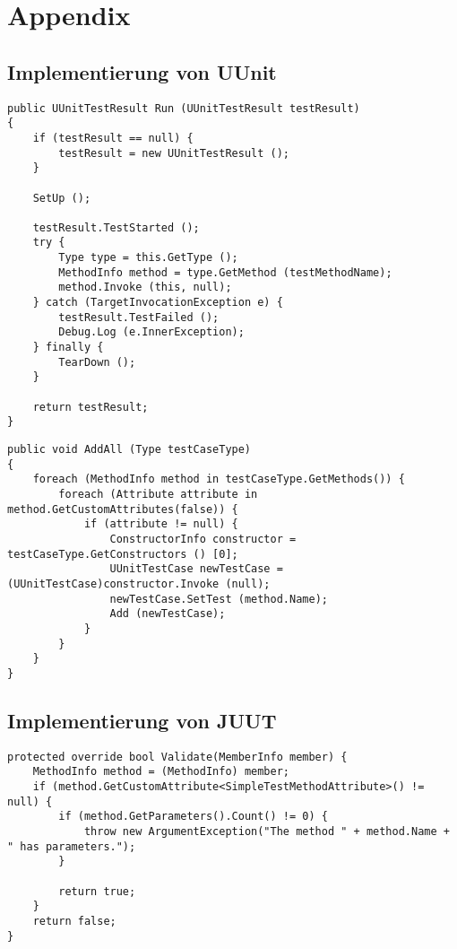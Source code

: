 \chapter{Appendix}

\section{Implementierung von UUnit}

\begin{lstlisting}[caption={[Quellcode der \textit{Run}-Methode von \textit{UUnitTestCase}]Quellcode der \textit{Run}-Methode von \textit{UUnitTestCase}}, label=code:UUnitTestCase_Run]
public UUnitTestResult Run (UUnitTestResult testResult)
{
	if (testResult == null) {
		testResult = new UUnitTestResult ();
	}
	
	SetUp ();
	
	testResult.TestStarted ();
	try {
		Type type = this.GetType ();
		MethodInfo method = type.GetMethod (testMethodName);
		method.Invoke (this, null);
	} catch (TargetInvocationException e) {
		testResult.TestFailed ();
		Debug.Log (e.InnerException);
	} finally {
		TearDown ();
	}
	
	return testResult;
}
\end{lstlisting}
\clearpage

\begin{lstlisting}[caption={[Quellcode der \textit{AddAll}-Methode von \textit{UUnitTestSuite}]Quellcode der \textit{AddAll}-Methode von \textit{UUnitTestSuite}}, label=code:UUnitTestSuite_AddAll]
public void AddAll (Type testCaseType)
{
	foreach (MethodInfo method in testCaseType.GetMethods()) {
		foreach (Attribute attribute in method.GetCustomAttributes(false)) {
			if (attribute != null) {
				ConstructorInfo constructor = testCaseType.GetConstructors () [0];
				UUnitTestCase newTestCase = (UUnitTestCase)constructor.Invoke (null);
				newTestCase.SetTest (method.Name);
				Add (newTestCase);
			}
		}
	}
}
\end{lstlisting}

\section{Implementierung von JUUT}
\begin{lstlisting}[caption={[Quellcode der \textit{Validate}-Methode von \textit{SimpleTestMethodAttribute}]Quellcode der \textit{Validate}-Methode von \textit{SimpleTestMethodAttribute}}, label=code:SimpleTestMethodAttribute_Validate]
protected override bool Validate(MemberInfo member) {
    MethodInfo method = (MethodInfo) member;
    if (method.GetCustomAttribute<SimpleTestMethodAttribute>() != null) {
        if (method.GetParameters().Count() != 0) {
            throw new ArgumentException("The method " + method.Name + " has parameters.");
        }

        return true;
    }
    return false;
}
\end{lstlisting}

